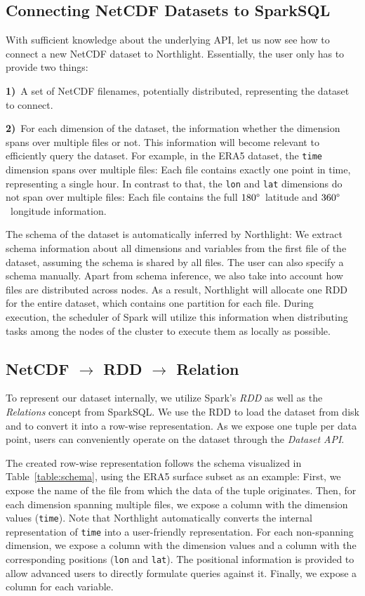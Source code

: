 \documentclass[conference]{IEEEtran}
\newcommand{\system}{Northlight}
\newcommand{\smalltt}[1]{{\texttt{\small #1}}}
\begin{document}
\subsection{Connecting NetCDF Datasets to SparkSQL}
With sufficient knowledge about the underlying API, let us now see how to connect a new NetCDF dataset to \system{}.
Essentially, the user only has to provide two things: 

\noindent \textbf{1)}~A set of NetCDF filenames, potentially distributed, representing the dataset to connect.

\noindent \textbf{2)}~For each dimension of the dataset, the information whether the dimension spans over multiple files or not. This information will become relevant to efficiently query the dataset. For example, in the ERA5 dataset, the \smalltt{time} dimension spans over multiple files: Each file contains exactly one point in time, representing a single hour. In contrast to that, the \smalltt{lon} and \smalltt{lat} dimensions do not span over multiple files: Each file contains the full $180\degree$~latitude and $360\degree$~longitude information. 

The schema of the dataset is automatically inferred by \system{}: We extract schema information about all dimensions and variables from the first file of the dataset, assuming the schema is shared by all files. The user can also specify a schema manually. 
Apart from schema inference, we also take into account how files are distributed across nodes. As a result, \system{} will allocate one RDD for the entire dataset, which contains one partition for each file. During execution, the scheduler of Spark will utilize this information when distributing tasks among the nodes of the cluster to execute them as locally as possible.

\subsection{NetCDF $\rightarrow$ RDD $\rightarrow$ Relation}
\label{ssec:netcdf_integration}

To represent our dataset internally, we utilize Spark's \textit{RDD}\cite{lit:rdd} as well as the \textit{Relations} concept from SparkSQL.
We use the RDD to load the dataset from disk and to convert it into a row-wise representation. As we expose one tuple per data point, users can conveniently operate on the dataset through the \textit{Dataset API}\cite{lit:datasets}.

The created row-wise representation follows the schema visualized in Table~\ref{table:schema}, using the ERA5 surface subset as an example: First, we expose the name of the file from which the data of the tuple originates. Then, for each dimension spanning multiple files, we expose a column with the dimension values (\smalltt{time}). Note that \system{} automatically converts the internal representation of \smalltt{time} into a user-friendly representation. For each non-spanning dimension, we expose a column with the dimension values and a column with the corresponding positions (\smalltt{lon} and \smalltt{lat}). The positional information is provided to allow advanced users to directly formulate queries against it. Finally, we expose a column for each variable.
\end{document}
